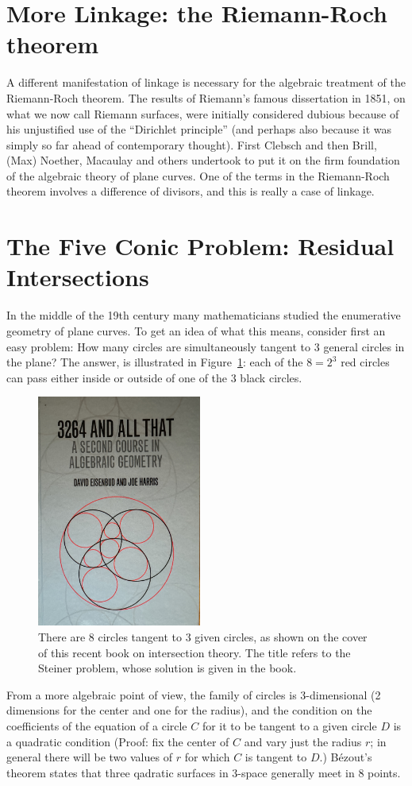 \documentclass[11pt, oneside]{article}   	%
\begin{document}
\section{More Linkage: the Riemann-Roch theorem}
A different manifestation of linkage is necessary for the algebraic treatment of the Riemann-Roch theorem. The results of Riemann's famous dissertation in 1851, on what we now call Riemann surfaces, were initially considered
dubious because of his unjustified use of the ``Dirichlet principle'' (and perhaps also because it was simply so far ahead of contemporary thought). First Clebsch and then Brill, (Max) Noether, Macaulay and others undertook to put it on the firm foundation of the algebraic theory of plane curves. One of the terms in the Riemann-Roch theorem involves a difference of divisors, and this is really a case of linkage.

\section{The Five Conic Problem: Residual Intersections}

In the middle of the 19th century many mathematicians studied the enumerative geometry of plane curves. To get an idea of what this means, consider first an easy problem: How many circles are simultaneously tangent to 3 general circles in the plane? The answer, is illustrated in Figure~\ref{3264Book}: each of the $8 = 2^{3}$ red circles can pass either inside or outside 
of one of the 3 black circles. \begin{figure}\label{3264Book}
\centerline {\includegraphics[height=3in]{3264Book.jpg}}
 \caption{There are 8 circles tangent to 3 given circles, as shown on the cover of this recent book
 on intersection theory. The title refers to the Steiner problem, whose solution is given in the book.}
\end{figure}
From a more algebraic point of view, the family of circles is 3-dimensional
(2 dimensions for the center and one for the radius), and the condition on the coefficients of the
equation of a circle $C$ for it to be tangent to a given circle $D$ is a quadratic condition (Proof: fix the center of $C$ and vary just the radius $r$; in general there will be two values of $r$ for which
$C$ is tangent to $D$.) B\'ezout's theorem states that three qadratic surfaces in 3-space generally
meet in 8 points.
\end{document}
